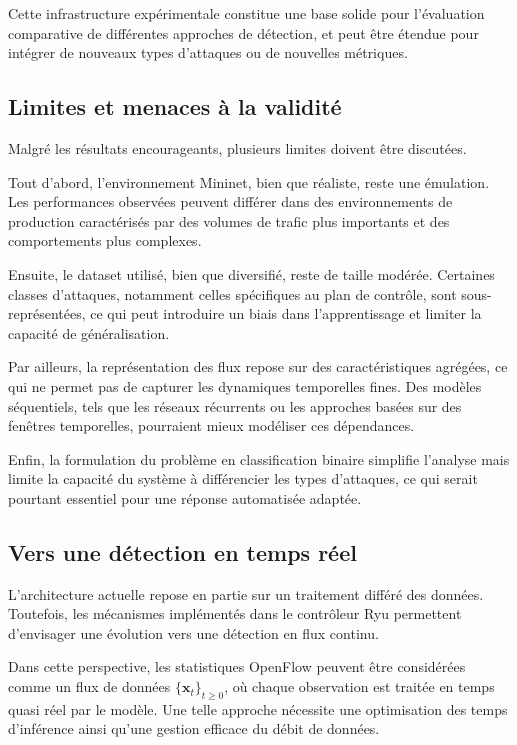 \documentclass[11pt]{article}
\begin{document}
Cette infrastructure expérimentale constitue une base solide pour l’évaluation comparative de différentes approches de détection, et peut être étendue pour intégrer de nouveaux types d’attaques ou de nouvelles métriques.

\subsection{Limites et menaces à la validité}

Malgré les résultats encourageants, plusieurs limites doivent être discutées.

Tout d’abord, l’environnement Mininet, bien que réaliste, reste une émulation. Les performances observées peuvent différer dans des environnements de production caractérisés par des volumes de trafic plus importants et des comportements plus complexes.

Ensuite, le dataset utilisé, bien que diversifié, reste de taille modérée. Certaines classes d’attaques, notamment celles spécifiques au plan de contrôle, sont sous-représentées, ce qui peut introduire un biais dans l’apprentissage et limiter la capacité de généralisation.

Par ailleurs, la représentation des flux repose sur des caractéristiques agrégées, ce qui ne permet pas de capturer les dynamiques temporelles fines. Des modèles séquentiels, tels que les réseaux récurrents ou les approches basées sur des fenêtres temporelles, pourraient mieux modéliser ces dépendances.

Enfin, la formulation du problème en classification binaire simplifie l’analyse mais limite la capacité du système à différencier les types d’attaques, ce qui serait pourtant essentiel pour une réponse automatisée adaptée.

\subsection{Vers une détection en temps réel}

L’architecture actuelle repose en partie sur un traitement différé des données. Toutefois, les mécanismes implémentés dans le contrôleur Ryu permettent d’envisager une évolution vers une détection en flux continu.

Dans cette perspective, les statistiques OpenFlow peuvent être considérées comme un flux de données $\{\mathbf{x}_t\}_{t \geq 0}$, où chaque observation est traitée en temps quasi réel par le modèle. Une telle approche nécessite une optimisation des temps d’inférence ainsi qu’une gestion efficace du débit de données.
\end{document}
